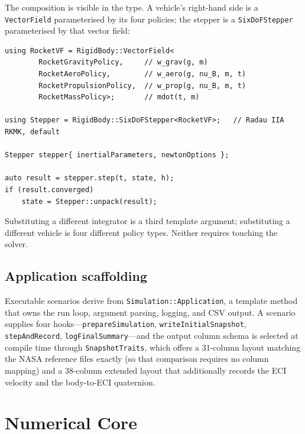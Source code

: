 \documentclass[a4paper,10pt]{article}
\newcommand{\code}[1]{\texttt{\small #1}}
\theoremstyle{definition}
\begin{document}
The composition is visible in the type.  A vehicle's right-hand side is a
\code{VectorField} parameterised by its four policies; the stepper is a
\code{SixDoFStepper} parameterised by that vector field:

\begin{lstlisting}[caption={A complete vehicle definition.  The Newton--Euler equation, the SE(3) kinematics, the implicit stage system, and the AD Jacobian are all supplied by the library.}, label={lst:vehicle}]
using RocketVF = RigidBody::VectorField<
        RocketGravityPolicy,     // w_grav(g, m)
        RocketAeroPolicy,        // w_aero(g, nu_B, m, t)
        RocketPropulsionPolicy,  // w_prop(g, nu_B, m, t)
        RocketMassPolicy>;       // mdot(t, m)

using Stepper = RigidBody::SixDoFStepper<RocketVF>;   // Radau IIA RKMK, default

Stepper stepper{ inertialParameters, newtonOptions };

auto result = stepper.step(t, state, h);
if (result.converged)
    state = Stepper::unpack(result);
\end{lstlisting}

Substituting a different integrator is a third template argument; substituting
a different vehicle is four different policy types.  Neither requires touching
the solver.

\subsection{Application scaffolding}

Executable scenarios derive from \code{Simulation::Application}, a template
method that owns the run loop, argument parsing, logging, and CSV output.  A
scenario supplies four hooks---\code{prepareSimulation}, \code{writeInitialSnapshot},
\code{stepAndRecord}, \code{logFinalSummary}---and the output column schema is
selected at compile time through \code{SnapshotTraits}, which offers a
31-column layout matching the NASA reference files exactly (so that comparison
requires no column mapping) and a 38-column extended layout that additionally
records the ECI velocity and the body-to-ECI quaternion.

\section{Numerical Core}
\label{sec:numerics}
\end{document}
